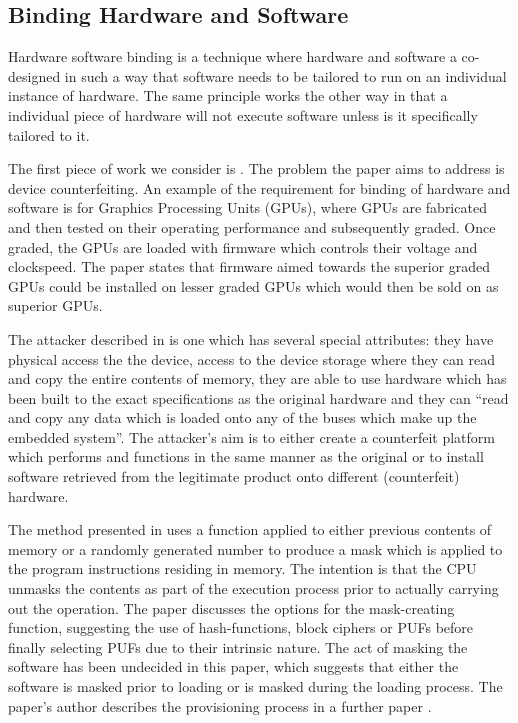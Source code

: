\subsection{Binding Hardware and Software}\label{bindingSolutions}

Hardware software binding is a technique where hardware and software a co-designed in such a way that software needs to be tailored to run on an individual instance of hardware. The same principle works the other way in that a individual piece of hardware will not execute software unless is it specifically tailored to it.

The first piece of work we consider is \cite{Lee2016}. The problem the paper aims to address is device counterfeiting. An example of the requirement for binding of hardware and software is for Graphics Processing Units (GPUs), where GPUs are fabricated and then tested on their operating performance and subsequently graded. Once graded, the GPUs are loaded with firmware which controls their voltage and clockspeed. The paper states that firmware aimed towards the superior graded GPUs could be installed on lesser graded GPUs which would then be sold on as superior GPUs.

The attacker described in \cite{Lee2016} is one which has several special attributes: they have physical access the the device, access to the device storage where they can read and copy the entire contents of memory, they are able to use hardware which has been built to the exact specifications as the original hardware and they can ``read and copy any data which is loaded onto any of the buses which make up the embedded system''. The attacker's aim is to either create a counterfeit platform which performs and functions in the same manner as the original or to install software retrieved from the legitimate product onto different (counterfeit) hardware.

The method presented in \cite{Lee2016} uses a function applied to either previous contents of memory or a randomly generated number to produce a mask which is applied to the program instructions residing in memory. The intention is that the CPU unmasks the contents as part of the execution process prior to actually carrying out the operation. The paper discusses the options for the mask-creating function, suggesting the use of hash-functions, block ciphers or PUFs before finally selecting PUFs due to their intrinsic nature. The act of masking the software has been undecided in this paper, which suggests that either the software is masked prior to loading or is masked during the loading process. The paper's author describes the provisioning process in a further paper \cite{Lee2017}.


